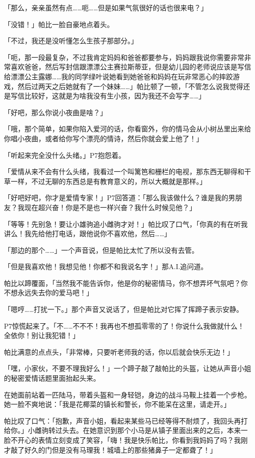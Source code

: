 「那么，亲亲虽然有点……呃……但是如果气氛很好的话也很来电？」

「没错！」帕比一脸自豪地点着头。

「不过，我还是没听懂怎么生孩子那部分。」

「呃，那一段最复杂，不过我肯定妈妈和爸爸都要参与，妈妈跟我说你需要非常非常喜欢爸爸，然后写封信跟漂漂公主赛拉斯蒂亚，但是幼儿园的老师说应该是写信给漂漂公主露娜……我的同学绿叶说她看到她爸爸和妈妈在玩非常恶心的摔跤游戏，然后过两天之后她就有了一个妹妹……」帕比顿了一顿，「不管怎么说我觉得还是写信比较好，这就是为啥我没有生小孩，因为我还不会写字……」

「好吧，那么你说小夜曲是啥？」

「哦，那个简单，如果你陷入爱河的话，你看窗外，你的情马会从小树丛里出来给你唱小夜曲，或者给你写个漂亮的情诗，然后你就会爱上他了！」

「听起来完全没什么头绪。」P7抱怨着。

「爱情从来不会有什么头绪，我看过一个叫篱笆和栅栏的电视，那东西无聊得和干草一样，不过无聊的东西总是有教育意义的，所以大概就是那样。」

「好吧好吧，你才是爱情专家！」P7回答道：「那么我该做什么？谁是我的男朋友？我现在超兴奋！你是不是也一样兴奋？我什么时候见他？」

「等等！先别急！要让小雄驹追小雌驹才对！」帕比叹了口气，「你真的有在听我讲么！我先给他打电话，跟他说你不喜欢他，然后……」

「那边的那个……」一个声音说，但是帕比太忙了所以没有去管。

「但是我喜欢他！我想见他！你都不和我说名字！」那A.I.追问道。

帕比以蹄覆面，「当然我不能告诉你，他是你的秘密情马，你不想弄坏气氛吧？你不想永远失去你的爱马吧！」

「嗯哼……打扰一下。」那个声音又说话了，但是帕比对它挥了挥蹄子表示安静。

P7惊慌起来了。「不……不不不！我再也不想孤零零的了！你说什么我做就什么！全依你！别让我犯错！」

帕比满意的点点头，「非常棒，只要听老师我的话，你以后就会快乐无边！」

「嘿，小家伙，不要不理我好么！」一个蹄子敲了敲帕比的头盔，让她从声音小姐的秘密爱情话题里面抬起头来。

在她面前站着一匹陆马，带着头盔和一身轻铠，身边的战斗马鞍上挂着一个步枪。她一脸不爽地说：「我是花椰菜的镇长和警长，你不能呆在这里，请走开。」

帕比叹了口气：「抱歉，声音小姐，看起来某些马已经等得不耐烦了，我回头再打给你。」小雌驹转过头去。在她意识到那个小马是从镇子里面出来的之后，本来一脸不开心的表情立刻变成了笑容，「嗨！我是快乐帕比，你看到我妈妈了吗？我刚才敲了好久的门但是没有马理我！城墙上的那些猪鼻子一定都聋了！」

